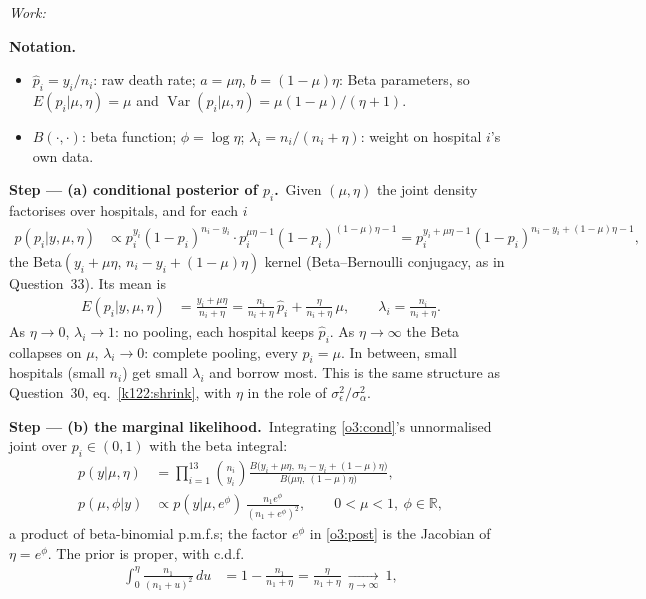 \documentclass[11pt,a4paper]{article}
\newif\ifsolucoes
\newcommand{\espacoresol}{4.5cm}   %
\newenvironment{notacao}{\par\smallskip\noindent\textbf{Notation.}\begin{itemize}[leftmargin=1.4em,topsep=1pt,itemsep=0pt]\small}{\end{itemize}}
\newcommand{\resolespaco}{\ifsolucoes\else\par\textit{Work:}\vspace{\espacoresol}\par\fi}
\newcommand{\passo}[2]{\par\smallskip\noindent\textbf{Step --- #1.}~#2}
\begin{document}
\resolespaco
\begin{sol}
\begin{notacao}
\item $\hat p_i=y_i/n_i$: raw death rate; $a=\mu\eta$, $b=(1-\mu)\eta$: Beta parameters, so $E(p_i|\mu,\eta)=\mu$ and $\operatorname{Var}(p_i|\mu,\eta)=\mu(1-\mu)/(\eta+1)$.
\item $B(\cdot,\cdot)$: beta function; $\phi=\log\eta$; $\lambda_i=n_i/(n_i+\eta)$: weight on hospital $i$'s own data.
\end{notacao}
\passo{(a) conditional posterior of $p_i$}{Given $(\mu,\eta)$ the joint density factorises over hospitals, and for each $i$
\begin{align}
p(p_i|y,\mu,\eta)&\propto p_i^{y_i}(1-p_i)^{n_i-y_i}\cdot p_i^{\mu\eta-1}(1-p_i)^{(1-\mu)\eta-1}=p_i^{y_i+\mu\eta-1}(1-p_i)^{n_i-y_i+(1-\mu)\eta-1},\label{o3:cond}
\end{align}
the Beta$(y_i+\mu\eta,\,n_i-y_i+(1-\mu)\eta)$ kernel (Beta--Bernoulli conjugacy, as in Question~33). Its mean is
\begin{align}
E(p_i|y,\mu,\eta)&=\frac{y_i+\mu\eta}{n_i+\eta}=\frac{n_i}{n_i+\eta}\,\hat p_i+\frac{\eta}{n_i+\eta}\,\mu,\qquad\lambda_i=\frac{n_i}{n_i+\eta}.\label{o3:shrink}
\end{align}
As $\eta\to0$, $\lambda_i\to1$: no pooling, each hospital keeps $\hat p_i$. As $\eta\to\infty$ the Beta collapses on $\mu$, $\lambda_i\to0$: complete pooling, every $p_i=\mu$. In between, small hospitals (small $n_i$) get small $\lambda_i$ and borrow most. This is the same structure as Question~30, eq.~\eqref{k122:shrink}, with $\eta$ in the role of $\sigma_\epsilon^2/\sigma_\alpha^2$.}
\passo{(b) the marginal likelihood}{Integrating \eqref{o3:cond}'s unnormalised joint over $p_i\in(0,1)$ with the beta integral:
\begin{align}
p(y|\mu,\eta)&=\prod_{i=1}^{13}\binom{n_i}{y_i}\frac{B\big(y_i+\mu\eta,\ n_i-y_i+(1-\mu)\eta\big)}{B\big(\mu\eta,\ (1-\mu)\eta\big)},\label{o3:bb}\\
p(\mu,\phi|y)&\propto p(y|\mu,e^\phi)\,\frac{n_1e^\phi}{(n_1+e^\phi)^2},\qquad0<\mu<1,\ \phi\in\mathbb R,\label{o3:post}
\end{align}
a product of beta-binomial p.m.f.s; the factor $e^\phi$ in \eqref{o3:post} is the Jacobian of $\eta=e^\phi$. The prior is proper, with c.d.f.
\begin{align}
\int_0^\eta\frac{n_1}{(n_1+u)^2}\,du&=1-\frac{n_1}{n_1+\eta}=\frac{\eta}{n_1+\eta}\ \xrightarrow[\eta\to\infty]{}\ 1,\label{o3:cdf}
\end{align}
}
\end{sol}
\end{document}

